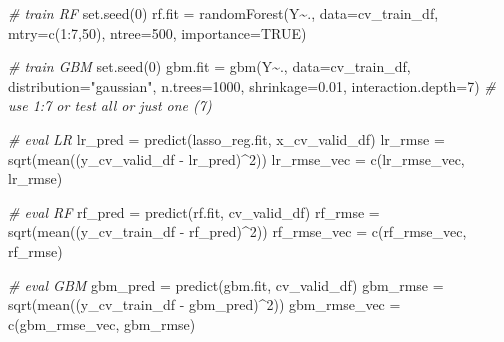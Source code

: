 \documentclass[
  11pt,
]{article}
\newenvironment{Shaded}{\begin{snugshade}}{\end{snugshade}}
\newcommand{\AttributeTok}[1]{\textcolor[rgb]{0.77,0.63,0.00}{#1}}
\newcommand{\CommentTok}[1]{\textcolor[rgb]{0.56,0.35,0.01}{\textit{#1}}}
\newcommand{\ConstantTok}[1]{\textcolor[rgb]{0.00,0.00,0.00}{#1}}
\newcommand{\DecValTok}[1]{\textcolor[rgb]{0.00,0.00,0.81}{#1}}
\newcommand{\FloatTok}[1]{\textcolor[rgb]{0.00,0.00,0.81}{#1}}
\newcommand{\FunctionTok}[1]{\textcolor[rgb]{0.00,0.00,0.00}{#1}}
\newcommand{\NormalTok}[1]{#1}
\newcommand{\OtherTok}[1]{\textcolor[rgb]{0.56,0.35,0.01}{#1}}
\newcommand{\SpecialCharTok}[1]{\textcolor[rgb]{0.00,0.00,0.00}{#1}}
\newcommand{\StringTok}[1]{\textcolor[rgb]{0.31,0.60,0.02}{#1}}
\begin{document}
\begin{Shaded}
\begin{Highlighting}[]
    \CommentTok{\# train RF}
    \FunctionTok{set.seed}\NormalTok{(}\DecValTok{0}\NormalTok{)}
\NormalTok{    rf.fit }\OtherTok{=} \FunctionTok{randomForest}\NormalTok{(Y}\SpecialCharTok{\textasciitilde{}}\NormalTok{., }
                          \AttributeTok{data=}\NormalTok{cv\_train\_df, }
                          \AttributeTok{mtry=}\FunctionTok{c}\NormalTok{(}\DecValTok{1}\SpecialCharTok{:}\DecValTok{7}\NormalTok{,}\DecValTok{50}\NormalTok{),}
                          \AttributeTok{ntree=}\DecValTok{500}\NormalTok{,}
                          \AttributeTok{importance=}\ConstantTok{TRUE}\NormalTok{)}
    
    \CommentTok{\# train GBM}
    \FunctionTok{set.seed}\NormalTok{(}\DecValTok{0}\NormalTok{)}
\NormalTok{    gbm.fit }\OtherTok{=} \FunctionTok{gbm}\NormalTok{(Y}\SpecialCharTok{\textasciitilde{}}\NormalTok{., }
                  \AttributeTok{data=}\NormalTok{cv\_train\_df,}
                  \AttributeTok{distribution=}\StringTok{"gaussian"}\NormalTok{,}
                  \AttributeTok{n.trees=}\DecValTok{1000}\NormalTok{,}
                  \AttributeTok{shrinkage=}\FloatTok{0.01}\NormalTok{, }
                  \AttributeTok{interaction.depth=}\DecValTok{7}\NormalTok{) }\CommentTok{\# use 1:7 or test all or just one (7)}
    
    \CommentTok{\# eval LR}
\NormalTok{    lr\_pred }\OtherTok{=} \FunctionTok{predict}\NormalTok{(lasso\_reg.fit, x\_cv\_valid\_df)}
\NormalTok{    lr\_rmse }\OtherTok{=} \FunctionTok{sqrt}\NormalTok{(}\FunctionTok{mean}\NormalTok{((y\_cv\_valid\_df }\SpecialCharTok{{-}}\NormalTok{ lr\_pred)}\SpecialCharTok{\^{}}\DecValTok{2}\NormalTok{))}
\NormalTok{    lr\_rmse\_vec }\OtherTok{=} \FunctionTok{c}\NormalTok{(lr\_rmse\_vec, lr\_rmse)}
    
    \CommentTok{\# eval RF}
\NormalTok{    rf\_pred }\OtherTok{=} \FunctionTok{predict}\NormalTok{(rf.fit, cv\_valid\_df)}
\NormalTok{    rf\_rmse }\OtherTok{=} \FunctionTok{sqrt}\NormalTok{(}\FunctionTok{mean}\NormalTok{((y\_cv\_train\_df }\SpecialCharTok{{-}}\NormalTok{ rf\_pred)}\SpecialCharTok{\^{}}\DecValTok{2}\NormalTok{))}
\NormalTok{    rf\_rmse\_vec }\OtherTok{=} \FunctionTok{c}\NormalTok{(rf\_rmse\_vec, rf\_rmse)}
    
    \CommentTok{\# eval GBM}
\NormalTok{    gbm\_pred }\OtherTok{=} \FunctionTok{predict}\NormalTok{(gbm.fit, cv\_valid\_df)}
\NormalTok{    gbm\_rmse }\OtherTok{=} \FunctionTok{sqrt}\NormalTok{(}\FunctionTok{mean}\NormalTok{((y\_cv\_train\_df }\SpecialCharTok{{-}}\NormalTok{ gbm\_pred)}\SpecialCharTok{\^{}}\DecValTok{2}\NormalTok{))}
\NormalTok{    gbm\_rmse\_vec }\OtherTok{=} \FunctionTok{c}\NormalTok{(gbm\_rmse\_vec, gbm\_rmse)}
    

\end{Highlighting}
\end{Shaded}
\end{document}
